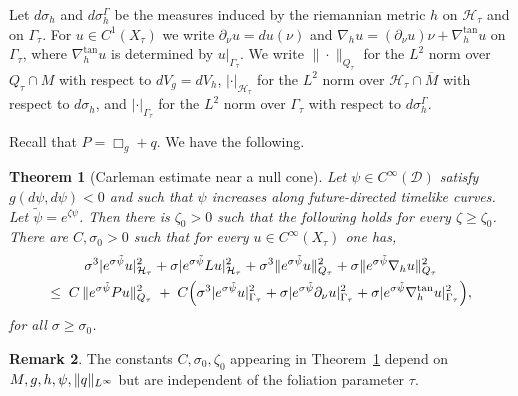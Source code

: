 \documentclass[12pt,reqno]{amsart}
\numberwithin{equation}{section}
\theoremstyle{definition}
\theoremstyle{plain}
\newtheorem{theorem}{Theorem}[section]
\theoremstyle{definition}
\theoremstyle{definition}
\newtheorem{remark}[theorem]{Remark}
\newcommand{\D}{\mathcal{D}}
\newcommand{\uu}{M}
\DeclarePairedDelimiter{\norm}{\lVert}{\rVert}
\begin{document}
 Let $d\sigma_h$ and $d\sigma_h^\Gamma$ be the measures induced by the riemannian metric $h$ on $\mathcal H_\tau$ and on $\Gamma_\tau$. For $u\in C^1(X_\tau)$ we write $\partial_\nu u=du(\nu)$ and $\nabla_hu=(\partial_\nu u)\nu+\nabla_h^{\tan}u$ on $\Gamma_\tau$, where $\nabla_h^{\tan}u$ is determined by $u|_{\Gamma_\tau}$. We write $\|\cdot\|_{Q_\tau}$ for the $L^2$ norm over $Q_\tau\cap\uu$ with respect to $dV_g=dV_h$, $|\cdot|_{\mathcal H_\tau}$ for the $L^2$ norm over $\mathcal H_\tau\cap\overline\uu$ with respect to $d\sigma_h$, and $|\cdot|_{\Gamma_\tau}$ for the $L^2$ norm over $\Gamma_\tau$ with respect to $d\sigma_h^\Gamma$.

 \medskip

 Recall that $P=\Box_g+q$. We have the following.

\begin{theorem}[Carleman estimate near a null cone]\label{thm_carleman}
Let $\psi\in C^\infty(\D)$ satisfy $g(d\psi,d\psi)<0$ and such that $\psi$ increases along future-directed timelike curves. Let $\tilde\psi = e^{\zeta\psi}$. Then there is $\zeta_0>0$ such that the following holds for every $\zeta\ge\zeta_0$. There are $C,\sigma_0>0$ such that for every $u\in C^\infty(X_\tau)$ one has,
\begin{multline*}
\sigma^3|e^{\sigma\tilde\psi}u|^2_{\mathcal H_\tau} + \sigma|e^{\sigma\tilde\psi}Lu|^2_{\mathcal H_\tau} + \sigma^3\|e^{\sigma\tilde\psi}u\|^2_{Q_\tau} + \sigma\|e^{\sigma\tilde\psi}\nabla_hu\|^2_{Q_\tau}\\
\le\; C\,\|e^{\sigma\tilde\psi}Pu\|^2_{Q_\tau} \;+\; C\Bigl(\sigma^3|e^{\sigma\tilde\psi}u|^2_{\Gamma_\tau} + \sigma|e^{\sigma\tilde\psi}\partial_\nu u|^2_{\Gamma_\tau} + \sigma|e^{\sigma\tilde\psi}\nabla_h^{\tan}u|^2_{\Gamma_\tau}\Bigr),
\end{multline*}
for all $\sigma \geq \sigma_0$.
\end{theorem}



\begin{remark}
    The constants $C,\sigma_0, \zeta_0$ appearing in Theorem~\ref{thm_carleman} depend on $M,g,h,\psi, \norm{q}_{L^\infty}$ but are independent of the foliation parameter $\tau$.
\end{remark}
\end{document}
